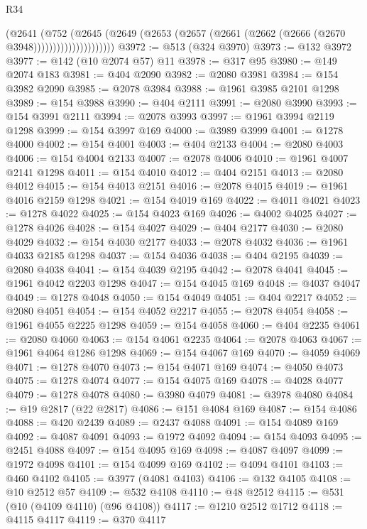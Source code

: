 \begin{lexlean}{R34}
\begin{coremodule}
                          (@2641
                            (@752
                              (@2645
                                (@2649
                                  (@2653
                                    (@2657 (@2661 (@2662 (@2666 (@2670 @3948)))))))))))))))))))))
@3972 := @513 (@324 @3970)
@3973 := @132 @3972
@3977 := @142 (@10 @2074 @57) @11
@3978 := @317 @95
@3980 := @149 @2074 @183
@3981 := @404 @2090
@3982 := @2080 @3981
@3984 := @154 @3982 @2090
@3985 := @2078 @3984
@3988 := @1961 @3985 @2101 @1298
@3989 := @154 @3988
@3990 := @404 @2111
@3991 := @2080 @3990
@3993 := @154 @3991 @2111
@3994 := @2078 @3993
@3997 := @1961 @3994 @2119 @1298
@3999 := @154 @3997 @169
@4000 := @3989 @3999
@4001 := @1278 @4000
@4002 := @154 @4001
@4003 := @404 @2133
@4004 := @2080 @4003
@4006 := @154 @4004 @2133
@4007 := @2078 @4006
@4010 := @1961 @4007 @2141 @1298
@4011 := @154 @4010
@4012 := @404 @2151
@4013 := @2080 @4012
@4015 := @154 @4013 @2151
@4016 := @2078 @4015
@4019 := @1961 @4016 @2159 @1298
@4021 := @154 @4019 @169
@4022 := @4011 @4021
@4023 := @1278 @4022
@4025 := @154 @4023 @169
@4026 := @4002 @4025
@4027 := @1278 @4026
@4028 := @154 @4027
@4029 := @404 @2177
@4030 := @2080 @4029
@4032 := @154 @4030 @2177
@4033 := @2078 @4032
@4036 := @1961 @4033 @2185 @1298
@4037 := @154 @4036
@4038 := @404 @2195
@4039 := @2080 @4038
@4041 := @154 @4039 @2195
@4042 := @2078 @4041
@4045 := @1961 @4042 @2203 @1298
@4047 := @154 @4045 @169
@4048 := @4037 @4047
@4049 := @1278 @4048
@4050 := @154 @4049
@4051 := @404 @2217
@4052 := @2080 @4051
@4054 := @154 @4052 @2217
@4055 := @2078 @4054
@4058 := @1961 @4055 @2225 @1298
@4059 := @154 @4058
@4060 := @404 @2235
@4061 := @2080 @4060
@4063 := @154 @4061 @2235
@4064 := @2078 @4063
@4067 := @1961 @4064 @1286 @1298
@4069 := @154 @4067 @169
@4070 := @4059 @4069
@4071 := @1278 @4070
@4073 := @154 @4071 @169
@4074 := @4050 @4073
@4075 := @1278 @4074
@4077 := @154 @4075 @169
@4078 := @4028 @4077
@4079 := @1278 @4078
@4080 := @3980 @4079
@4081 := @3978 @4080
@4084 := @19 @2817 (@22 @2817)
@4086 := @151 @4084 @169
@4087 := @154 @4086
@4088 := @420 @2439
@4089 := @2437 @4088
@4091 := @154 @4089 @169
@4092 := @4087 @4091
@4093 := @1972 @4092
@4094 := @154 @4093
@4095 := @2451 @4088
@4097 := @154 @4095 @169
@4098 := @4087 @4097
@4099 := @1972 @4098
@4101 := @154 @4099 @169
@4102 := @4094 @4101
@4103 := @460 @4102
@4105 := @3977 (@4081 @4103)
@4106 := @132 @4105
@4108 := @10 @2512 @57
@4109 := @532 @4108
@4110 := @48 @2512
@4115 := @531 (@10 (@4109 @4110) (@96 @4108))
@4117 := @1210 @2512 @1712
@4118 := @4115 @4117
@4119 := @370 @4117

\end{coremodule}
\end{lexlean}

